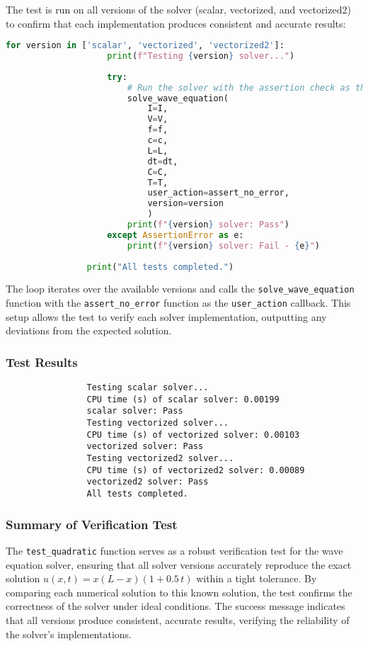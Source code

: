 \documentclass{article}
\begin{document}
			The test is run on all versions of the solver (scalar, vectorized, and vectorized2) to confirm that each implementation produces consistent and accurate results:
			\begin{lstlisting}[language=Python]
				for version in ['scalar', 'vectorized', 'vectorized2']:
					print(f"Testing {version} solver...")
				
					try:
						# Run the solver with the assertion check as the user action
						solve_wave_equation(
							I=I,
							V=V,
							f=f,
							c=c,
							L=L,
							dt=dt,
							C=C,
							T=T,
							user_action=assert_no_error,
							version=version
							)
						print(f"{version} solver: Pass")
					except AssertionError as e:
						print(f"{version} solver: Fail - {e}")
				
				print("All tests completed.")
			\end{lstlisting}
			
			The loop iterates over the available versions and calls the \texttt{solve\_wave\_equation} function with the \texttt{assert\_no\_error} function as the \texttt{user\_action} callback. This setup allows the test to verify each solver implementation, outputting any deviations from the expected solution.
			
			\subsubsection{Test Results}
			
					
			\begin{verbatim}
				Testing scalar solver...
				CPU time (s) of scalar solver: 0.00199
				scalar solver: Pass
				Testing vectorized solver...
				CPU time (s) of vectorized solver: 0.00103
				vectorized solver: Pass
				Testing vectorized2 solver...
				CPU time (s) of vectorized2 solver: 0.00089
				vectorized2 solver: Pass
				All tests completed.
			\end{verbatim}
			
					
			
			\subsubsection{Summary of Verification Test}
			
			The \texttt{test\_quadratic} function serves as a robust verification test for the wave equation solver, ensuring that all solver versions accurately reproduce the exact solution \( u(x, t) = x(L - x)(1 + 0.5 \, t) \) within a tight tolerance. By comparing each numerical solution to this known solution, the test confirms the correctness of the solver under ideal conditions. The success message indicates that all versions produce consistent, accurate results, verifying the reliability of the solver’s implementations.
		
\end{document}
